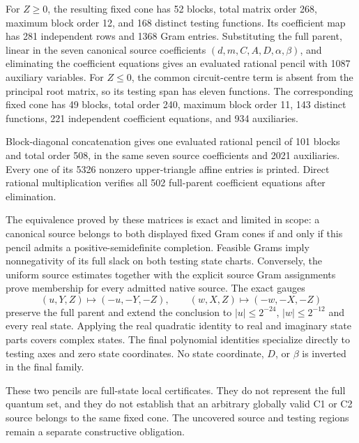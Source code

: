 For $Z\ge0$, the resulting fixed cone has 52 blocks, total matrix
order 268, maximum block order 12, and 168 distinct testing functions.
Its coefficient map has 281 independent rows and 1368 Gram entries.
Substituting the full parent, linear in the seven canonical source
coefficients $(d,m,C,A,D,\alpha,\beta)$, and eliminating the
coefficient equations gives an evaluated rational pencil with 1087
auxiliary variables. For $Z\le0$, the common circuit-centre term is
absent from the principal root matrix, so its testing span has eleven
functions. The corresponding fixed cone has 49 blocks, total order
240, maximum block order 11, 143 distinct functions, 221 independent
coefficient equations, and 934 auxiliaries.

Block-diagonal concatenation gives one evaluated rational pencil of
101 blocks and total order 508, in the same seven source coefficients
and 2021 auxiliaries. Every one of its 5326 nonzero upper-triangle
affine entries is printed. Direct rational multiplication verifies all
502 full-parent coefficient equations after elimination.

The equivalence proved by these matrices is exact and limited in
scope: a canonical source belongs to both displayed fixed Gram cones
if and only if this pencil admits a positive-semidefinite completion.
Feasible Grams imply nonnegativity of its full slack on both testing
state charts. Conversely, the uniform source estimates together with
the explicit source Gram assignments prove membership for every
admitted native source. The exact gauges
\[
 (u,Y,Z)\mapsto(-u,-Y,-Z),\qquad
 (w,X,Z)\mapsto(-w,-X,-Z)
\]
preserve the full parent and extend the conclusion to
$|u|\le2^{-24}$, $|w|\le2^{-12}$ and every real state. Applying the
real quadratic identity to real and imaginary state parts covers
complex states. The final polynomial identities specialize directly
to testing axes and zero state coordinates. No state coordinate,
$D$, or $\beta$ is inverted in the final family.

These two pencils are full-state local certificates. They do not
represent the full quantum set, and they do not establish that an
arbitrary globally valid C1 or C2 source belongs to the same fixed
cone. The uncovered source and testing regions remain a separate
constructive obligation.

